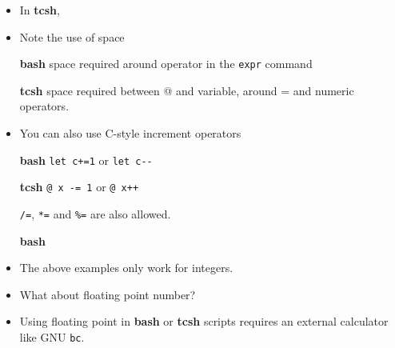 \documentclass[slidestop,mathserif,compress,xcolor=svgnames]{beamer}
\begin{document}
\begin{frame}
\begin{itemize}
    \framebreak
    \item In \textbf{tcsh},
    \item Note the use of space
    \item[\textbf{bash}] space required around operator in the \texttt{expr} command
    \item[\textbf{tcsh}] space required between @ and variable, around = and numeric operators. 
    \item You can also use C-style increment operators
    \item[\textbf{bash}] \texttt{let c+=1} or \texttt{let c-{}-}
    \item[\textbf{tcsh}] \texttt{@ x -= 1} or \texttt{@ x++}
    \item[] \texttt{/=}, \texttt{*=} and \texttt{\%=} are also allowed.
    \item[\textbf{bash}]
    \item The above examples only work for integers.
    \item What about floating point number?
    \framebreak
    \item Using floating point in \textbf{bash} or \textbf{tcsh} scripts requires an external calculator like GNU \texttt{bc}.
\end{itemize}
\end{frame}
\end{document}
